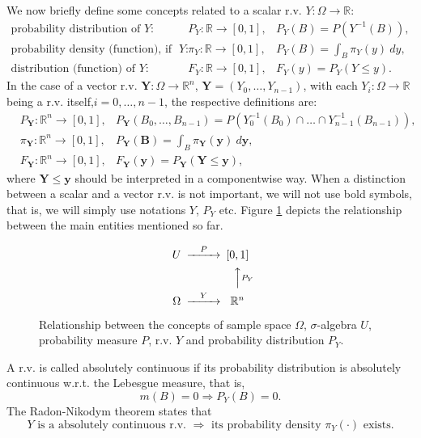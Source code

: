 We now briefly define some concepts related to a scalar r.v. $Y:\Omega\rightarrow\mathbb{R}$:
\begin{eqnarray*}
\mbox{probability distribution of }                      Y: & P_Y:  \mathbb{R}\rightarrow[0,1], & P_Y(B) = P(Y^{-1}(B)),       \\
\mbox{probability density (function), if it exists, of } Y: & \pi_Y:\mathbb{R}\rightarrow[0,1], & P_Y(B) = \int_B \pi_Y(y)~dy, \\
\mbox{distribution (function) of }                       Y: & F_Y:  \mathbb{R}\rightarrow[0,1], & F_Y(y) = P_Y(Y\leqslant y).
\end{eqnarray*}
In the case of a vector r.v. $\mathbf{Y}:\Omega\rightarrow\mathbb{R}^n$, $\mathbf{Y}=(Y_0,\ldots,Y_{n-1})$,
with each $Y_i:\Omega\rightarrow\mathbb{R}$ being a r.v. itself,$i=0,\ldots,n-1$, the respective definitions are:
\begin{eqnarray*}
 & P_{\mathbf{Y}}:  \mathbb{R}^n\rightarrow[0,1], & P_{\mathbf{Y}}(B_0,\ldots,B_{n-1}) = P(Y_0^{-1}(B_0)\cap\ldots\cap Y_{n-1}^{-1}(B_{n-1})), \\
 & \pi_{\mathbf{Y}}:\mathbb{R}^n\rightarrow[0,1], & P_{\mathbf{Y}}(\mathbf{B}) = \int_B \pi_{\mathbf{Y}}(\mathbf{y})~d\mathbf{y}, \\
 & F_{\mathbf{Y}}:  \mathbb{R}^n\rightarrow[0,1], & F_{\mathbf{Y}}(\mathbf{y}) = P_{\mathbf{Y}}(\mathbf{Y}\leqslant\mathbf{y}),
\end{eqnarray*}
where $\mathbf{Y}\leqslant\mathbf{y}$ should be interpreted in a componentwise way.
When a distinction between a scalar and a vector r.v. is not important, we will not use bold symbols, that is, we will simply use notations $Y$, $P_Y$ etc.
Figure \ref{fig-rv-diagram} depicts the relationship between the main entities mentioned so far.

\begin{figure}
\[
\begin{CD}
U      @>P>> [0,1] \\
@.     @AA\text{$P_Y$}A \\
\Omega @>Y>> \mathbb{R}^n
\end{CD}
\]
\caption{Relationship between the concepts of
sample space $\Omega$,
$\sigma$-algebra $U$,
probability measure $P$,
r.v. $Y$ and
probability distribution $P_Y$.}
\label{fig-rv-diagram}
\end{figure}

A r.v. is called absolutely continuous if its probability distribution is absolutely continuous w.r.t. the Lebesgue measure, that is,
\begin{equation*}
m(B) = 0 \Rightarrow P_Y(B) = 0.
\end{equation*}
The Radon-Nikodym theorem \cite{KaSo05} states that
\begin{equation}\label{eq-radon-nik}
Y\mbox{ is a absolutely continuous r.v. }\Rightarrow\mbox{ its probability density }\pi_Y(\cdot)\mbox{ exists}.
\end{equation}

